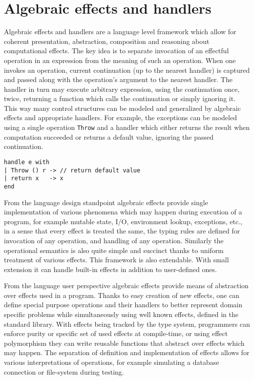 \documentclass[inz, english, shortabstract]{iithesis}
\begin{document}
\section{Algebraic effects and handlers}
Algebraic effects and handlers are a language level framework which allow for coherent presentation, abstraction, composition and reasoning about computational effects.
The key idea is to separate invocation of an effectful operation in an expression from the meaning of such an operation.
When one invokes an operation, current continuation (up to the nearest handler) is captured and passed along with the operation's argument to the nearest handler.
The handler in turn may execute arbitrary expression, using the continuation once, twice, returning a function which calls the continuation or simply ignoring it.
This way many control structures can be modeled and generalized by algebraic effects and appropriate handlers.
For example, the exceptions can be modeled using a single operation \texttt{Throw} and a handler which either returns the result when computation succeeded or returns a default value, ignoring the passed continuation.
\begin{verbatim}
handle e with
| Throw () r -> // return default value
| return x   -> x
end
\end{verbatim}
From the language design standpoint algebraic effects provide single implementation of various phenomena which may happen during execution of a program, for example mutable state, I/O, environment lookup, exceptions, etc., in a sense that every effect is treated the same, the typing rules are defined for invocation of any operation, and handling of any operation.
Similarly the operational semantics is also quite simple and succinct thanks to uniform treatment of various effects.
This framework is also extendable.
With small extension it can handle built-in effects in addition to user-defined ones.

From the language user perspective algebraic effects provide means of abstraction over effects used in a program.
Thanks to easy creation of new effects, one can define special purpose operations and their handlers to better represent domain specific problems while simultaneously using well known effects, defined in the standard library.
With effects being tracked by the type system, programmers can enforce purity or specific set of used effects at compile-time, or using effect polymorphism they can write reusable functions that abstract over effects which may happen.
The separation of definition and implementation of effects allows for various interpretations of operations, for example simulating a database connection or file-system during testing.
\end{document}
